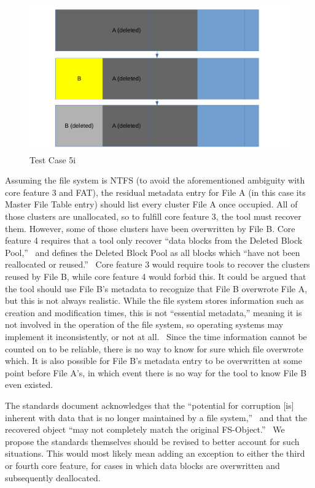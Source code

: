 \begin{figure}[h]
    \centering
    \includegraphics[width=\linewidth]{fig/case5i.png}
    \caption{Test Case 5i}
    \label{fig:case_5i}
\end{figure}

Assuming the file system is NTFS (to avoid the aforementioned ambiguity with core feature 3 and FAT), the residual metadata entry for File A (in this case its Master File Table entry) should list every cluster File A once occupied. 
All of those clusters are unallocated, so to fulfill core feature 3, the tool must recover them. 
However, some of those clusters have been overwritten by File B. Core feature 4 requires that a tool only recover ``data blocks from the Deleted Block Pool,''~\cite{meta:dfr:standards} and defines the Deleted Block Pool as all blocks which ``have not been reallocated or reused.''~\cite{meta:dfr:standards}
Core feature 3 would require tools to recover the clusters reused by File B, while core feature 4 would forbid this. 
It could be argued that the tool should use File B's metadata to recognize that File B overwrote File A, but this is not always realistic. 
While the file system stores information such as creation and modification times, this is not ``essential metadata,'' meaning it is not involved in the operation of the file system, so operating systems may implement it inconsistently, or not at all.~\cite{carrier:filesystems}
Since the time information cannot be counted on to be reliable, there is no way to know for sure which file overwrote which. 
It is also possible for File B's metadata entry to be overwritten at some point before File A's, in which event there is no way for the tool to know File B even existed.

The standards document acknowledges that the ``potential for corruption [is] inherent with data that is no longer maintained by a file system,''~\cite{meta:dfr:standards} and that the recovered object ``may not completely match the original FS-Object.''~\cite{meta:dfr:standards}
We propose the standards themselves should be revised to better account for such situations.
This would most likely mean adding an exception to either the third or fourth core feature, for cases in which data blocks are overwritten and subsequently deallocated.

